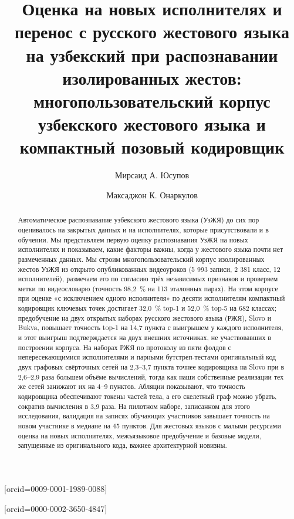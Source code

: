 \documentclass[a4paper,fleqn]{cas-dc}
\newcommand{\authA}{Мирсаид А. Юсупов}
\newcommand{\authB}{Максаджон К. Онаркулов}
\begin{document}
\let\WriteBookmarks\relax
\def\floatpagepagefraction{1}
\def\textpagefraction{.001}
\title[mode=title]{Оценка на новых исполнителях и перенос с русского жестового языка на узбекский при распознавании изолированных жестов: многопользовательский корпус узбекского жестового языка и компактный позовый кодировщик}
\author[1]{\authA}[orcid=0009-0001-1989-0088]
\cormark[1]
\author[2]{\authB}[orcid=0000-0002-3650-4847]
\begin{abstract}
Автоматическое распознавание узбекского жестового языка (УзЖЯ) до сих пор оценивалось на закрытых данных и на исполнителях, которые присутствовали и в обучении. Мы представляем первую оценку распознавания УзЖЯ на новых исполнителях и показываем, какие факторы важны, когда у жестового языка почти нет размеченных данных. Мы строим многопользовательский корпус изолированных жестов УзЖЯ из открыто опубликованных видеоуроков (5 993 записи, 2 381 класс, 12 исполнителей), размечаем его по согласию трёх независимых признаков и проверяем метки по видеословарю (точность 98,2~\% на 113 эталонных парах). На этом корпусе при оценке «с исключением одного исполнителя» по десяти исполнителям компактный кодировщик ключевых точек достигает 32,0~\% top-1 и 52,0~\% top-5 на 682 классах; предобучение на двух открытых наборах русского жестового языка (РЖЯ), Slovo и Bukva, повышает точность top-1 на 14,7 пункта с выигрышем у каждого исполнителя, и этот выигрыш подтверждается на двух внешних источниках, не участвовавших в построении корпуса. На наборах РЖЯ по протоколу из пяти фолдов с непересекающимися исполнителями и парными бутстреп-тестами оригинальный код двух графовых свёрточных сетей на 2,3–3,7 пункта точнее кодировщика на Slovo при в 2,6–2,9 раза большем объёме вычислений, тогда как наши собственные реализации тех же сетей занижают их на 4–9 пунктов. Абляции показывают, что точность кодировщика обеспечивают токены частей тела, а его скелетный граф можно убрать, сократив вычисления в 3,9 раза. На пилотном наборе, записанном для этого исследования, валидация на записях обучающих участников завышает точность на новом участнике в медиане на 45 пунктов. Для жестовых языков с малыми ресурсами оценка на новых исполнителях, межъязыковое предобучение и базовые модели, запущенные из оригинального кода, важнее архитектурной новизны.
\end{abstract}
\end{document}
